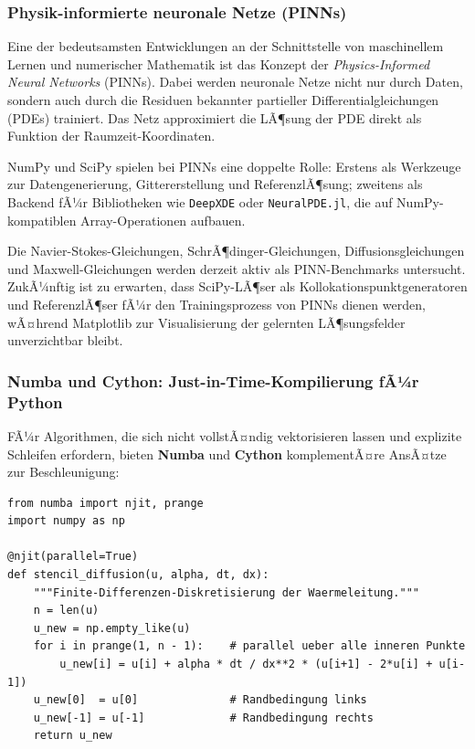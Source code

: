 \documentclass[12pt, a4paper]{article}
\begin{document}
\subsubsection{Physik-informierte neuronale Netze (PINNs)}
\label{subsubsec:pinn}

Eine der bedeutsamsten Entwicklungen an der Schnittstelle von maschinellem
Lernen und numerischer Mathematik ist das Konzept der
\emph{Physics-Informed Neural Networks} (PINNs). Dabei werden neuronale
Netze nicht nur durch Daten, sondern auch durch die Residuen bekannter
partieller Differentialgleichungen (PDEs) trainiert. Das Netz approximiert
die LÃ¶sung der PDE direkt als Funktion der Raumzeit-Koordinaten.

NumPy und SciPy spielen bei PINNs eine doppelte Rolle: Erstens als
Werkzeuge zur Datengenerierung, Gittererstellung und ReferenzlÃ¶sung;
zweitens als Backend fÃ¼r Bibliotheken wie \texttt{DeepXDE} oder
\texttt{NeuralPDE.jl}, die auf NumPy-kompatiblen Array-Operationen aufbauen.

Die Navier-Stokes-Gleichungen, SchrÃ¶dinger-Gleichungen, Diffusionsgleichungen
und Maxwell-Gleichungen werden derzeit aktiv als PINN-Benchmarks untersucht.
ZukÃ¼nftig ist zu erwarten, dass SciPy-LÃ¶ser als Kollokationspunktgeneratoren
und ReferenzlÃ¶ser fÃ¼r den Trainingsprozess von PINNs dienen werden, wÃ¤hrend
Matplotlib zur Visualisierung der gelernten LÃ¶sungsfelder unverzichtbar bleibt.

\subsubsection{Numba und Cython: Just-in-Time-Kompilierung fÃ¼r Python}
\label{subsubsec:numba}

FÃ¼r Algorithmen, die sich nicht vollstÃ¤ndig vektorisieren lassen und
explizite Schleifen erfordern, bieten \textbf{Numba} und \textbf{Cython}
komplementÃ¤re AnsÃ¤tze zur Beschleunigung:

\begin{lstlisting}[caption={Numba: JIT-Kompilierung von Python-Schleifen}]
from numba import njit, prange
import numpy as np

@njit(parallel=True)
def stencil_diffusion(u, alpha, dt, dx):
    """Finite-Differenzen-Diskretisierung der Waermeleitung."""
    n = len(u)
    u_new = np.empty_like(u)
    for i in prange(1, n - 1):    # parallel ueber alle inneren Punkte
        u_new[i] = u[i] + alpha * dt / dx**2 * (u[i+1] - 2*u[i] + u[i-1])
    u_new[0]  = u[0]              # Randbedingung links
    u_new[-1] = u[-1]             # Randbedingung rechts
    return u_new
\end{lstlisting}
\end{document}

